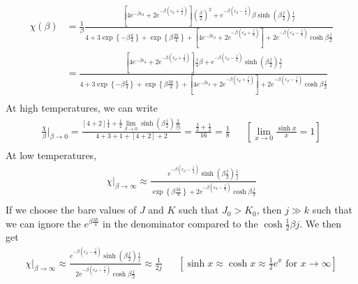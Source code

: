 \documentclass[12pt,twoside]{article}
\numberwithin{equation}{section}
\begin{document}
\begin{equation}\begin{aligned}
	\chi(\beta) &= \frac{1}{\beta}\frac{\left[4e^{-\beta \epsilon_d} + 2e^{-\beta \left(\epsilon_d + \frac{j}{2}\right)}\right] \left(\frac{\beta}{2}\right)^2 + e^{-\beta\left(\epsilon_d - \frac{j}{4}\right)}\beta \sinh \left(\beta \frac{j}{2} \right) \frac{1}{j}}{4 + 3\exp\left\{-\beta \frac{k}{4}\right\} + \exp\left\{\beta \frac{3k}{4}\right\} + \left[4e^{-\beta \epsilon_d} + 2e^{-\beta \left(\epsilon_d + \frac{j}{2}\right)}\right] + 2e^{-\beta\left(\epsilon_d - \frac{j}{4}\right)}\cosh \beta \frac{j}{2}}\\
		    &=\frac{\left[4e^{-\beta \epsilon_d} + 2e^{-\beta \left(\epsilon_d + \frac{j}{2}\right)}\right] \frac{1}{4}\beta + e^{-\beta\left(\epsilon_d - \frac{j}{4}\right)} \sinh \left(\beta \frac{j}{2} \right) \frac{1}{j}}{4 + 3\exp\left\{-\beta \frac{k}{4}\right\} + \exp\left\{\beta \frac{3k}{4}\right\} + \left[4e^{-\beta \epsilon_d} + 2e^{-\beta \left(\epsilon_d + \frac{j}{2}\right)}\right] + 2e^{-\beta\left(\epsilon_d - \frac{j}{4}\right)}\cosh \beta \frac{j}{2}}\\
\end{aligned}\end{equation}
At high temperatures, we can write
\begin{equation}\begin{aligned}
	\frac{\chi}{\beta}\vert_{\beta \to 0} = \frac{\left[4 + 2\right] \frac{1}{4} + \frac{1}{2}\lim_{\beta \to 0}\sinh \left(\beta \frac{j}{2} \right) \frac{2}{\beta j}}{4 + 3 + 1 + \left[4 + 2\right] + 2} = \frac{\frac{3}{2} + \frac{1}{2}}{16} = \frac{1}{8} && \left[\lim_{x \to 0} \frac{\sinh x}{x} = 1\right] \\
\end{aligned}\end{equation}
At low temperatures,
\begin{equation}\begin{aligned}
	\chi\vert_{\beta \to \infty} \approx \frac{e^{-\beta\left(\epsilon_d - \frac{j}{4}\right)} \sinh \left(\beta \frac{j}{2} \right) \frac{1}{j}}{\exp\left\{\beta \frac{3k}{4}\right\} + 2e^{-\beta\left(\epsilon_d - \frac{j}{4}\right)}\cosh \beta \frac{j}{2}}\\
\end{aligned}\end{equation}
If we choose the bare values of \(J\) and \(K\) such that \(J_0 >K_0\), then \(j \gg k\) such that we can ignore the \(e^{\beta \frac{3k}{4}}\) in the denominator compared to the \(\cosh \frac{1}{2}\beta j\). We then get
\begin{equation}\begin{aligned}
	\chi\vert_{\beta \to \infty} \approx \frac{e^{-\beta\left(\epsilon_d - \frac{j}{4}\right)} \sinh \left(\beta \frac{j}{2} \right) \frac{1}{j}}{2e^{-\beta\left(\epsilon_d - \frac{j}{4}\right)}\cosh \beta \frac{j}{2}} \approx \frac{1}{2j} &&\left[\sinh x \approx \cosh x \approx \frac{1}{2}e^x \text{ for }x\to \infty\right] \\
\end{aligned}\end{equation}
\end{document}
